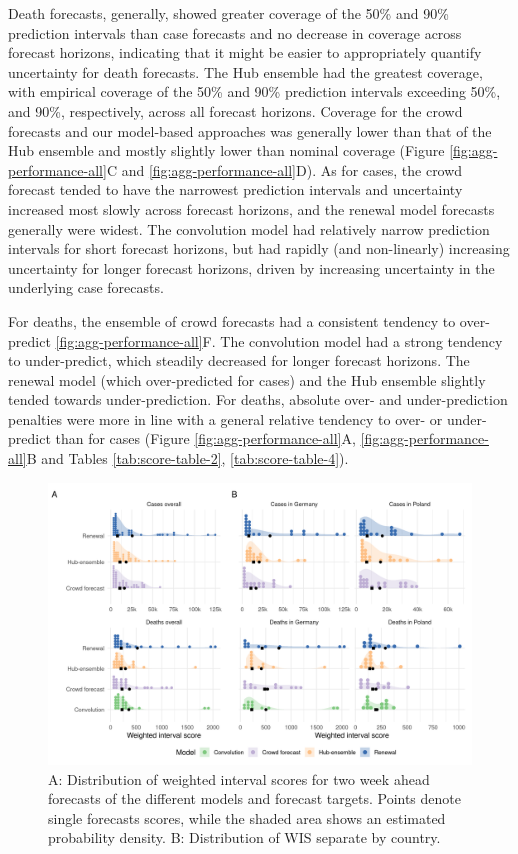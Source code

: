 \documentclass[
]{article}
\begin{document}
Death forecasts, generally, showed greater coverage of the 50\% and 90\% prediction intervals than case forecasts and no decrease in coverage across forecast horizons, indicating that it might be easier to appropriately quantify uncertainty for death forecasts. The Hub ensemble had the greatest coverage, with empirical coverage of the 50\% and 90\% prediction intervals exceeding 50\%, and 90\%, respectively, across all forecast horizons. Coverage for the crowd forecasts and our model-based approaches was generally lower than that of the Hub ensemble and mostly slightly lower than nominal coverage (Figure \ref{fig:agg-performance-all}C and \ref{fig:agg-performance-all}D). As for cases, the crowd forecast tended to have the narrowest prediction intervals and uncertainty increased most slowly across forecast horizons, and the renewal model forecasts generally were widest. The convolution model had relatively narrow prediction intervals for short forecast horizons, but had rapidly (and non-linearly) increasing uncertainty for longer forecast horizons, driven by increasing uncertainty in the underlying case forecasts.

For deaths, the ensemble of crowd forecasts had a consistent tendency to over-predict \ref{fig:agg-performance-all}F. The convolution model had a strong tendency to under-predict, which steadily decreased for longer forecast horizons. The renewal model (which over-predicted for cases) and the Hub ensemble slightly tended towards under-prediction. For deaths, absolute over- and under-prediction penalties were more in line with a general relative tendency to over- or under-predict than for cases (Figure \ref{fig:agg-performance-all}A, \ref{fig:agg-performance-all}B and Tables \ref{tab:score-table-2}, \ref{tab:score-table-4}).

\begin{figure}[H]
\includegraphics[width=1\linewidth,]{../analysis/plots/distribution_scores_wis-2} \caption{A: Distribution of weighted interval scores for two week ahead forecasts of the different models and forecast targets. Points denote single forecasts scores, while the shaded area shows an estimated probability density. B: Distribution of WIS separate by country.}\label{fig:distribution-scores}
\end{figure}
\end{document}
